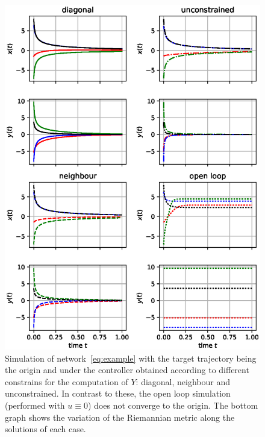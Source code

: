 \documentclass[10pt,twocolumn,twoside]{IEEEtran}
\theoremstyle{plain}
\theoremstyle{definition}
\theoremstyle{remark}
\begin{document}
\begin{figure}[htpb!]
	\centering
	\includegraphics[width=\linewidth]{./imgs/simulation.eps}
	\vspace{-2em}
	\caption{Simulation of network~\eqref{eq:example} with the target trajectory being the origin and under the controller obtained according to different constrains for the computation of $Y$: diagonal, neighbour and unconstrained. In contrast to these, the open loop simulation (performed with $u\equiv0$) does not converge to the origin. The bottom graph shows the variation of the Riemannian metric along the solutions of each case.}
	\label{fig:3dsim}
\end{figure}
\end{document}
